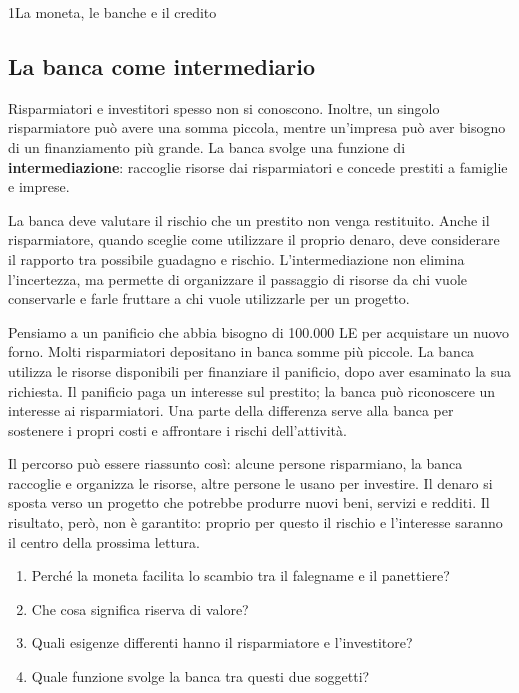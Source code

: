 \begin{lettura}{1}{La moneta, le banche e il credito}
\subsection*{La banca come intermediario}
Risparmiatori e investitori spesso non si conoscono. Inoltre, un singolo risparmiatore può avere una somma piccola, mentre un'impresa può aver bisogno di un finanziamento più grande. La banca svolge una funzione di \textbf{intermediazione}: raccoglie risorse dai risparmiatori e concede prestiti a famiglie e imprese.

La banca deve valutare il rischio che un prestito non venga restituito. Anche il risparmiatore, quando sceglie come utilizzare il proprio denaro, deve considerare il rapporto tra possibile guadagno e rischio. L'intermediazione non elimina l'incertezza, ma permette di organizzare il passaggio di risorse da chi vuole conservarle e farle fruttare a chi vuole utilizzarle per un progetto.

Pensiamo a un panificio che abbia bisogno di 100.000 LE per acquistare un nuovo forno. Molti risparmiatori depositano in banca somme più piccole. La banca utilizza le risorse disponibili per finanziare il panificio, dopo aver esaminato la sua richiesta. Il panificio paga un interesse sul prestito; la banca può riconoscere un interesse ai risparmiatori. Una parte della differenza serve alla banca per sostenere i propri costi e affrontare i rischi dell'attività.

Il percorso può essere riassunto così: alcune persone risparmiano, la banca raccoglie e organizza le risorse, altre persone le usano per investire. Il denaro si sposta verso un progetto che potrebbe produrre nuovi beni, servizi e redditi. Il risultato, però, non è garantito: proprio per questo il rischio e l'interesse saranno il centro della prossima lettura.





\attivita
\begin{enumerate}

\item Perché la moneta facilita lo scambio tra il falegname e il panettiere?

\item Che cosa significa riserva di valore?

\item Quali esigenze differenti hanno il risparmiatore e l’investitore?

\item Quale funzione svolge la banca tra questi due soggetti?


\end{enumerate}
\end{lettura}
